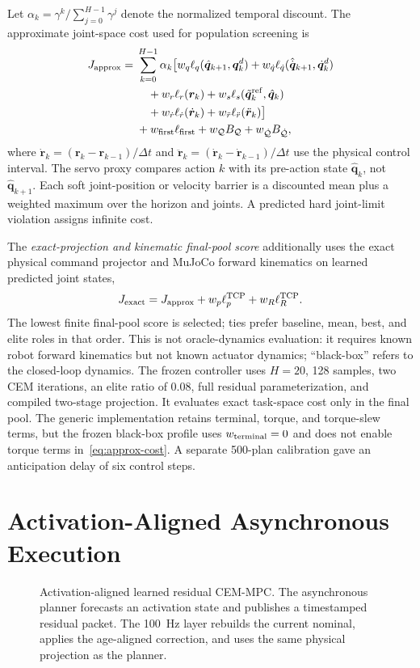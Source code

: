 \documentclass[conference]{IEEEtran}
\begin{document}
Let $\alpha_k=\gamma^k/\sum_{j=0}^{H-1}\gamma^j$ denote the normalized temporal discount. The approximate joint-space cost used for population screening is
\begin{align}
 J_{\rm approx}={}&\sum_{k=0}^{H-1}\alpha_k\bigl[
 w_q\ell_q(\hat{\bm q}_{k+1},\bm q^d_k)
 +w_{\dot q}\ell_{\dot q}(\hat{\dot{\bm q}}_{k+1},
 \dot{\bm q}^d_k) \notag\\
 &\quad+w_r\ell_r(\bm r_k)
 +w_s\ell_s(\tilde{\bm q}^{\rm ref}_k,\hat{\bm q}_k)
 \notag\\
 &\quad+w_{\dot r}\ell_{\dot r}(\dot{\bm r}_k)
 +w_{\ddot r}\ell_{\ddot r}(\ddot{\bm r}_k)\bigr]
 \notag\\
 &+w_{\rm first}\ell_{\rm first}
 +w_{\mathcal Q}B_{\mathcal Q}
 +w_{\dot{\mathcal Q}}B_{\dot{\mathcal Q}},
 \label{eq:approx-cost}
\end{align}
where $\dot{\bm r}_k=(\bm r_k-\bm r_{k-1})/\Delta t$ and
$\ddot{\bm r}_k=(\dot{\bm r}_k-\dot{\bm r}_{k-1})/\Delta t$ use the physical control interval. The servo proxy compares action $k$ with its pre-action state $\hat{\bm q}_k$, not $\hat{\bm q}_{k+1}$. Each soft joint-position or velocity barrier is a discounted mean plus a weighted maximum over the horizon and joints. A predicted hard joint-limit violation assigns infinite cost.

The \emph{exact-projection and kinematic final-pool score} additionally uses the exact physical command projector and MuJoCo forward kinematics on learned predicted joint states,
\begin{equation}
 J_{\rm exact}=J_{\rm approx}
 +w_p\ell_p^{\rm TCP}+w_R\ell_R^{\rm TCP}.
 \label{eq:exact-cost}
\end{equation}
The lowest finite final-pool score is selected; ties prefer baseline, mean, best, and elite roles in that order. This is not oracle-dynamics evaluation: it requires known robot forward kinematics but not known actuator dynamics; ``black-box'' refers to the closed-loop dynamics. The frozen controller uses $H=20$, 128 samples, two CEM iterations, an elite ratio of 0.08, full residual parameterization, and compiled two-stage projection. It evaluates exact task-space cost only in the final pool. The generic implementation retains terminal, torque, and torque-slew terms, but the frozen black-box profile uses $w_{\rm terminal}=0$ and does not enable torque terms in~\eqref{eq:approx-cost}. A separate 500-plan calibration gave an anticipation delay of six control steps.

\section{Activation-Aligned Asynchronous Execution}
\label{sec:execution}
\begin{figure}[!t]
  \centering
  
  \caption{Activation-aligned learned residual CEM-MPC. The asynchronous planner forecasts an activation state and publishes a timestamped residual packet. The 100~Hz layer rebuilds the current nominal, applies the age-aligned correction, and uses the same physical projection as the planner.}
  \label{fig:system}
\end{figure}
\end{document}
